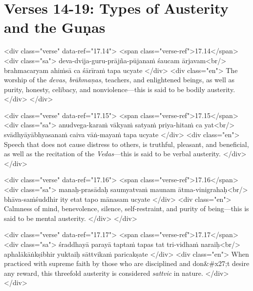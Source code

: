 \section{Verses 14-19: Types of Austerity and the Guṇas}\label{sec-verses-14-19-types-of-austerity-and-the-gunas}


\begin{html}
<div class="verse" data-ref="17.14">
  <span class="verse-ref">17.14</span>
  <div class="sa">
    deva-dvija-guru-prājña-pūjanaṁ śaucam ārjavam<br/>
    brahmacaryam ahiṁsā ca śārīraṁ tapa ucyate
  </div>
  <div class="en">
    The worship of the \textit{devas}, \textit{brāhmaṇas}, teachers, and enlightened beings, as well as purity, honesty, celibacy, and nonviolence---this is said to be bodily austerity.
  </div>
</div>
\end{html}



\begin{html}
<div class="verse" data-ref="17.15">
  <span class="verse-ref">17.15</span>
  <div class="sa">
    anudvega-karaṁ vākyaṁ satyaṁ priya-hitaṁ ca yat<br/>
    svādhyāyābhyasanaṁ caiva vāṅ-mayaṁ tapa ucyate
  </div>
  <div class="en">
    Speech that does not cause distress to others, is truthful, pleasant, and beneficial, as well as the recitation of the \textit{Vedas}---this is said to be verbal austerity.
  </div>
</div>
\end{html}



\begin{html}
<div class="verse" data-ref="17.16">
  <span class="verse-ref">17.16</span>
  <div class="sa">
    manaḥ-prasādaḥ saumyatvaṁ maunam ātma-vinigrahaḥ<br/>
    bhāva-saṁśuddhir ity etat tapo mānasam ucyate
  </div>
  <div class="en">
    Calmness of mind, benevolence, silence, self-restraint, and purity of being---this is said to be mental austerity.
  </div>
</div>
\end{html}



\begin{html}
<div class="verse" data-ref="17.17">
  <span class="verse-ref">17.17</span>
  <div class="sa">
    śraddhayā parayā taptaṁ tapas tat tri-vidhaṁ naraiḥ<br/>
    aphalākāṅkṣibhir yuktaiḥ sāttvikaṁ paricakṣate
  </div>
  <div class="en">
    When practiced with supreme faith by those who are disciplined and don&#x27;t desire any reward, this threefold austerity is considered \textit{sattvic} in nature.
  </div>
</div>
\end{html}




